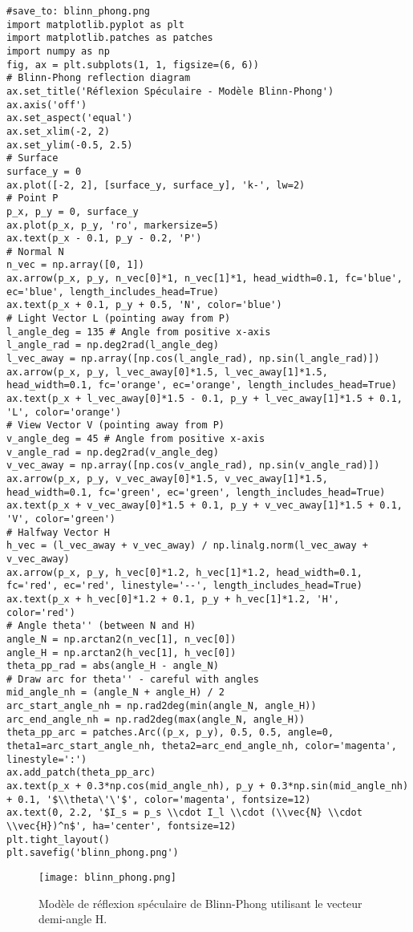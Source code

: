 \begin{verbatim}
#save_to: blinn_phong.png
import matplotlib.pyplot as plt
import matplotlib.patches as patches
import numpy as np
fig, ax = plt.subplots(1, 1, figsize=(6, 6))
# Blinn-Phong reflection diagram
ax.set_title('Réflexion Spéculaire - Modèle Blinn-Phong')
ax.axis('off')
ax.set_aspect('equal')
ax.set_xlim(-2, 2)
ax.set_ylim(-0.5, 2.5)
# Surface
surface_y = 0
ax.plot([-2, 2], [surface_y, surface_y], 'k-', lw=2)
# Point P
p_x, p_y = 0, surface_y
ax.plot(p_x, p_y, 'ro', markersize=5)
ax.text(p_x - 0.1, p_y - 0.2, 'P')
# Normal N
n_vec = np.array([0, 1])
ax.arrow(p_x, p_y, n_vec[0]*1, n_vec[1]*1, head_width=0.1, fc='blue', ec='blue', length_includes_head=True)
ax.text(p_x + 0.1, p_y + 0.5, 'N', color='blue')
# Light Vector L (pointing away from P)
l_angle_deg = 135 # Angle from positive x-axis
l_angle_rad = np.deg2rad(l_angle_deg)
l_vec_away = np.array([np.cos(l_angle_rad), np.sin(l_angle_rad)])
ax.arrow(p_x, p_y, l_vec_away[0]*1.5, l_vec_away[1]*1.5, head_width=0.1, fc='orange', ec='orange', length_includes_head=True)
ax.text(p_x + l_vec_away[0]*1.5 - 0.1, p_y + l_vec_away[1]*1.5 + 0.1, 'L', color='orange')
# View Vector V (pointing away from P)
v_angle_deg = 45 # Angle from positive x-axis
v_angle_rad = np.deg2rad(v_angle_deg)
v_vec_away = np.array([np.cos(v_angle_rad), np.sin(v_angle_rad)])
ax.arrow(p_x, p_y, v_vec_away[0]*1.5, v_vec_away[1]*1.5, head_width=0.1, fc='green', ec='green', length_includes_head=True)
ax.text(p_x + v_vec_away[0]*1.5 + 0.1, p_y + v_vec_away[1]*1.5 + 0.1, 'V', color='green')
# Halfway Vector H
h_vec = (l_vec_away + v_vec_away) / np.linalg.norm(l_vec_away + v_vec_away)
ax.arrow(p_x, p_y, h_vec[0]*1.2, h_vec[1]*1.2, head_width=0.1, fc='red', ec='red', linestyle='--', length_includes_head=True)
ax.text(p_x + h_vec[0]*1.2 + 0.1, p_y + h_vec[1]*1.2, 'H', color='red')
# Angle theta'' (between N and H)
angle_N = np.arctan2(n_vec[1], n_vec[0])
angle_H = np.arctan2(h_vec[1], h_vec[0])
theta_pp_rad = abs(angle_H - angle_N)
# Draw arc for theta'' - careful with angles
mid_angle_nh = (angle_N + angle_H) / 2
arc_start_angle_nh = np.rad2deg(min(angle_N, angle_H))
arc_end_angle_nh = np.rad2deg(max(angle_N, angle_H))
theta_pp_arc = patches.Arc((p_x, p_y), 0.5, 0.5, angle=0, theta1=arc_start_angle_nh, theta2=arc_end_angle_nh, color='magenta', linestyle=':')
ax.add_patch(theta_pp_arc)
ax.text(p_x + 0.3*np.cos(mid_angle_nh), p_y + 0.3*np.sin(mid_angle_nh) + 0.1, '$\\theta\'\'$', color='magenta', fontsize=12)
ax.text(0, 2.2, '$I_s = p_s \\cdot I_l \\cdot (\\vec{N} \\cdot \\vec{H})^n$', ha='center', fontsize=12)
plt.tight_layout()
plt.savefig('blinn_phong.png')
\end{verbatim}
\begin{figure}[H]
\centering
\texttt{[image: blinn\_phong.png]}
\caption{Modèle de réflexion spéculaire de Blinn-Phong utilisant le vecteur demi-angle H.}
\label{fig:blinn_phong}
\end{figure}
